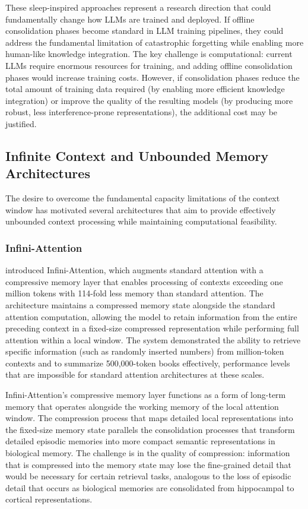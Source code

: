 \documentclass[11pt,letterpaper]{article}
\begin{document}
These sleep-inspired approaches represent a research direction that could fundamentally change how LLMs are trained and deployed. If offline consolidation phases become standard in LLM training pipelines, they could address the fundamental limitation of catastrophic forgetting while enabling more human-like knowledge integration. The key challenge is computational: current LLMs require enormous resources for training, and adding offline consolidation phases would increase training costs. However, if consolidation phases reduce the total amount of training data required (by enabling more efficient knowledge integration) or improve the quality of the resulting models (by producing more robust, less interference-prone representations), the additional cost may be justified.

\subsection{Infinite Context and Unbounded Memory Architectures}

The desire to overcome the fundamental capacity limitations of the context window has motivated several architectures that aim to provide effectively unbounded context processing while maintaining computational feasibility.

\subsubsection{Infini-Attention}

\cite{munkhdalai2024leave} introduced Infini-Attention, which augments standard attention with a compressive memory layer that enables processing of contexts exceeding one million tokens with 114-fold less memory than standard attention. The architecture maintains a compressed memory state alongside the standard attention computation, allowing the model to retain information from the entire preceding context in a fixed-size compressed representation while performing full attention within a local window. The system demonstrated the ability to retrieve specific information (such as randomly inserted numbers) from million-token contexts and to summarize 500,000-token books effectively, performance levels that are impossible for standard attention architectures at these scales.

Infini-Attention's compressive memory layer functions as a form of long-term memory that operates alongside the working memory of the local attention window. The compression process that maps detailed local representations into the fixed-size memory state parallels the consolidation processes that transform detailed episodic memories into more compact semantic representations in biological memory. The challenge is in the quality of compression: information that is compressed into the memory state may lose the fine-grained detail that would be necessary for certain retrieval tasks, analogous to the loss of episodic detail that occurs as biological memories are consolidated from hippocampal to cortical representations.
\end{document}
